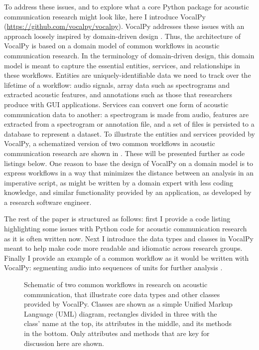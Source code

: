 \documentclass[11pt]{article}
\begin{document}
To address these issues, and to explore what a core Python package for acoustic communication research might look like, here I introduce VocalPy (\url{https://github.com/vocalpy/vocalpy}).
VocalPy addresses these issues with an approach loosely inspired by domain-driven design \cite{evansDomaindrivenDesignTackling2004}.
Thus, the architecture of VocalPy is based on a domain model of common workflows in acoustic communication research. In the terminology of domain-driven design, this domain model is meant to capture the essential entities, services, and relationships in these workflows.
Entities are uniquely-identifiable data we need to track over the lifetime of a workflow: audio signals, array data such as spectrograms and extracted acoustic features, and annotations such as those that researchers produce with GUI applications.
Services can convert one form of acoustic communication data to another: a spectrogram is made from audio, features are extracted from a spectrogram or annotation file, and a set of files is persisted to a database to represent a dataset.
To illustrate the entities and services provided by VocalPy, a schematized version of two common workflows in acoustic communication research are shown in . These will be presented further as code listings below.
One reason to base the design of VocalPy on a domain model is to express workflows in a way that minimizes the distance between an analysis in an imperative script, as might be written by a domain expert with less coding knowledge, and similar functionality provided by an application, as developed by a research software engineer.

The rest of the paper is structured as follows:
first I provide a code listing highlighting some issues with Python code for acoustic communication research as it is often written now.
Next I introduce the data types and classes in VocalPy meant to help make code more readable and idiomatic across research groups.
Finally I provide an example of a common workflow as it would be written with VocalPy: segmenting audio into sequences of units for further analysis \cite{kershenbaumAcousticSequencesNonhuman2016}.

\begin{figure}[ht]
 \centerline{}
 \caption{Schematic of two common workflows in research on acoustic communication, that illustrate core data types and other classes provided by VocalPy. Classes are shown as a simple Unified Markup Language (UML) diagram, rectangles divided in three with the class' name at the top, its attributes in the middle, and its methods in the bottom. Only attributes and methods that are key for discussion here are shown.}

 \label{fig:schematic}
\end{figure}
\end{document}
